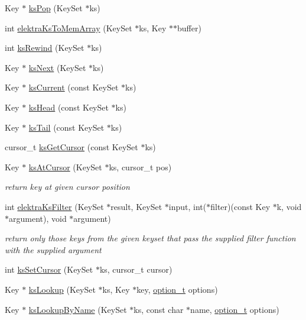 \begin{DoxyCompactItemize}
\item 
Key $\ast$ \hyperlink{group__keyset_gae42530b04defb772059de0600159cf69}{ks\-Pop} (Key\-Set $\ast$ks)
\item 
int \hyperlink{group__keyset_gac3e995819383f904369c260f212125f5}{elektra\-Ks\-To\-Mem\-Array} (Key\-Set $\ast$ks, Key $\ast$$\ast$buffer)
\item 
int \hyperlink{group__keyset_gabe793ff51f1728e3429c84a8a9086b70}{ks\-Rewind} (Key\-Set $\ast$ks)
\item 
Key $\ast$ \hyperlink{group__keyset_ga317321c9065b5a4b3e33fe1c399bcec9}{ks\-Next} (Key\-Set $\ast$ks)
\item 
Key $\ast$ \hyperlink{group__keyset_ga4287b9416912c5f2ab9c195cb74fb094}{ks\-Current} (const Key\-Set $\ast$ks)
\item 
Key $\ast$ \hyperlink{group__keyset_gae7dbf3aef70e67b5328475eb3d1f92f5}{ks\-Head} (const Key\-Set $\ast$ks)
\item 
Key $\ast$ \hyperlink{group__keyset_gadca442c4ab43cf532b15091d7711559e}{ks\-Tail} (const Key\-Set $\ast$ks)
\item 
cursor\-\_\-t \hyperlink{group__keyset_gaffe507ab9281c322eb16c3e992075d29}{ks\-Get\-Cursor} (const Key\-Set $\ast$ks)
\item 
Key $\ast$ \hyperlink{group__keyset_ga3604cc41505f7e19db945cece67190b6}{ks\-At\-Cursor} (Key\-Set $\ast$ks, cursor\-\_\-t pos)
\begin{DoxyCompactList}\small\item\em return key at given cursor position \end{DoxyCompactList}\item 
int \hyperlink{group__keyset_ga5e727c6d8197f5871a2075454b6214f2}{elektra\-Ks\-Filter} (Key\-Set $\ast$result, Key\-Set $\ast$input, int($\ast$filter)(const Key $\ast$k, void $\ast$argument), void $\ast$argument)
\begin{DoxyCompactList}\small\item\em return only those keys from the given keyset that pass the supplied filter function with the supplied argument \end{DoxyCompactList}\item 
int \hyperlink{group__keyset_gad94c9ffaa3e8034564c0712fd407c345}{ks\-Set\-Cursor} (Key\-Set $\ast$ks, cursor\-\_\-t cursor)
\item 
Key $\ast$ \hyperlink{group__keyset_gaa34fc43a081e6b01e4120daa6c112004}{ks\-Lookup} (Key\-Set $\ast$ks, Key $\ast$key, \hyperlink{group__keyset_ga98a3d6a4016c9dad9cbd1a99a9c2a45a}{option\-\_\-t} options)
\item 
Key $\ast$ \hyperlink{group__keyset_gad2e30fb6d4739d917c5abb2ac2f9c1a1}{ks\-Lookup\-By\-Name} (Key\-Set $\ast$ks, const char $\ast$name, \hyperlink{group__keyset_ga98a3d6a4016c9dad9cbd1a99a9c2a45a}{option\-\_\-t} options)
\end{DoxyCompactItemize}


